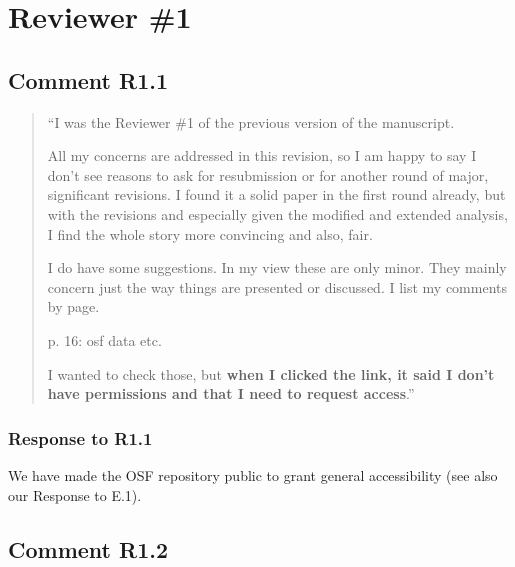 \documentclass[12pt]{article}
\begin{document}
\section*{Reviewer \#1} 

\subsection*{Comment R1.1}
\begin{quote}
``I was the Reviewer \#1 of the previous version of the manuscript.

All my concerns are addressed in this revision, so I am happy to say I don't see reasons to ask for resubmission or for another round of major, significant revisions. I found it a solid paper in the first round already, but with the revisions and especially given the modified and extended analysis, I find the whole story more convincing and also, fair.

I do have some suggestions. In my view these are only minor. They mainly concern just the way things are presented or discussed. I list my comments by page.

p. 16: osf data etc.

I wanted to check those, but \textbf{when I clicked the link, it said I don't have permissions and that I need to request access}.''
\end{quote}

\subsubsection*{Response to R1.1}
We have made the OSF repository public to grant general accessibility (see also our Response to E.1).

\subsection*{Comment R1.2}
\end{document}

